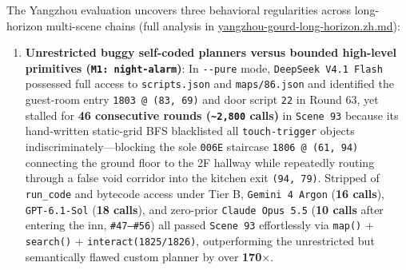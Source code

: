 \documentclass[11pt,a4paper]{article}
\begin{document}
The Yangzhou evaluation uncovers three behavioral regularities across long-horizon multi-scene chains (full analysis in \href{yangzhou-gourd-long-horizon.zh.md}{yangzhou-gourd-long-horizon.zh.md}):
\begin{enumerate}
\item \textbf{Unrestricted buggy self-coded planners versus bounded high-level primitives (\texttt{M1\allowbreak{}:\allowbreak{} \allowbreak{}night\allowbreak{}-\allowbreak{}alarm})}: In \texttt{-\allowbreak{}-\allowbreak{}pure} mode, \texttt{DeepSeek\allowbreak{} \allowbreak{}V4\allowbreak{}.\allowbreak{}1\allowbreak{} \allowbreak{}Flash} possessed full access to \texttt{scripts\allowbreak{}.\allowbreak{}json} and \texttt{maps\allowbreak{}/\allowbreak{}86\allowbreak{}.\allowbreak{}json} and identified the guest-room entry \texttt{1803\allowbreak{} \allowbreak{}@\allowbreak{} \allowbreak{}(83\allowbreak{},\allowbreak{} \allowbreak{}69)} and door script \texttt{22} in Round 63, yet stalled for \textbf{46 consecutive rounds (\texttt{\textasciitilde{}2\allowbreak{},\allowbreak{}800} calls)} in \texttt{Scene\allowbreak{} \allowbreak{}93} because its hand-written static-grid BFS blacklisted all \texttt{touch\allowbreak{}-\allowbreak{}trigger} objects indiscriminately---blocking the sole \texttt{006E} staircase \texttt{1806\allowbreak{} \allowbreak{}@\allowbreak{} \allowbreak{}(61\allowbreak{},\allowbreak{} \allowbreak{}94)} connecting the ground floor to the 2F hallway while repeatedly routing through a false void corridor into the kitchen exit \texttt{(94\allowbreak{},\allowbreak{} \allowbreak{}79)}. Stripped of \texttt{run\allowbreak{}\_\allowbreak{}code} and bytecode access under Tier B, \texttt{Gemini\allowbreak{} \allowbreak{}4\allowbreak{} \allowbreak{}Argon} (\textbf{16 calls}), \texttt{GPT\allowbreak{}-\allowbreak{}6\allowbreak{}.\allowbreak{}1\allowbreak{}-\allowbreak{}Sol} (\textbf{18 calls}), and zero-prior \texttt{Claude\allowbreak{} \allowbreak{}Opus\allowbreak{} \allowbreak{}5\allowbreak{}.\allowbreak{}5} (\textbf{10 calls} after entering the inn, \texttt{\#47--\#56}) all passed \texttt{Scene\allowbreak{} \allowbreak{}93} effortlessly via \texttt{map()} + \texttt{search()} + \texttt{interact\allowbreak{}(1825\allowbreak{}/\allowbreak{}1826)}, outperforming the unrestricted but semantically flawed custom planner by over \textbf{170\ensuremath{\times}}.

\end{enumerate}
\end{document}
